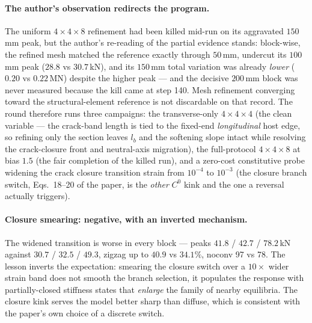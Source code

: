 \paragraph{The author's observation redirects the program.} The
uniform $4{\times}4{\times}8$ refinement had been killed mid-run on
its aggravated $150$\,mm peak, but the author's re-reading of the
partial evidence stands: block-wise, the refined mesh matched the
reference exactly through $50$\,mm, undercut its $100$\,mm peak
($28.8$ vs $30.7$\,kN), and its $150$\,mm total variation was already
\emph{lower} ($0.20$ vs $0.22$\,MN) despite the higher peak --- and
the decisive $200$\,mm block was never measured because the kill came
at step 140. Mesh refinement converging toward the structural-element
reference is not discardable on that record. The round therefore runs
three campaigns: the transverse-only $4{\times}4{\times}4$ (the clean
variable --- the crack-band length is tied to the fixed-end
\emph{longitudinal} host edge, so refining only the section leaves
$l_b$ and the softening slope intact while resolving the
crack-closure front and neutral-axis migration), the full-protocol
$4{\times}4{\times}8$ at bias $1.5$ (the fair completion of the
killed run), and a zero-cost constitutive probe widening the crack
closure transition strain from $10^{-4}$ to $10^{-3}$ (the closure
branch switch, Eqs.~18--20 of the paper, is the \emph{other} $C^0$
kink and the one a reversal actually triggers).

\paragraph{Closure smearing: negative, with an inverted mechanism.}
The widened transition is worse in every block --- peaks $41.8$ /
$42.7$ / $78.2$\,kN against $30.7$ / $32.5$ / $49.3$, zigzag up to
$40.9$ vs $34.1\%$, noconv 97 vs 78. The lesson inverts the
expectation: smearing the closure switch over a $10\times$ wider
strain band does not smooth the branch selection, it populates the
response with partially-closed stiffness states that \emph{enlarge}
the family of nearby equilibria. The closure kink serves the model
better sharp than diffuse, which is consistent with the paper's own
choice of a discrete switch.

